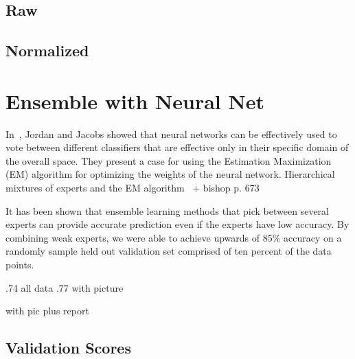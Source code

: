 \subsection{Raw}
\subsection{Normalized}
\section{Ensemble with Neural Net}
In~\cite{jordanHierarchicalMixturesExperts1994}, Jordan and Jacobs showed that
neural networks can be effectively used to vote between different classifiers
that are effective only in their specific domain of the overall space. They present a
case for using the Estimation Maximization (EM) algorithm for optimizing the
weights of the neural network.
Hierarchical mixtures of experts and the EM
algorithm~\cite{jordanHierarchicalMixturesExperts1994}
+ bishop p. 673~\cite{bishopPatternRecognitionMachine2006}

It has been shown that ensemble learning methods that pick between several
experts can provide accurate prediction even if the experts have low accuracy.
By combining weak experts, we were able to achieve upwards of 85\% accuracy on a
randomly sample held out validation set comprised of ten percent of the data
points.


.74 all data 
.77 with picture
 
 with pic plus report 

\subsection{Validation Scores}
